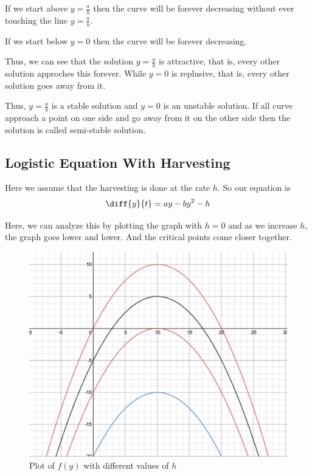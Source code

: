 If we start above $y = \frac{a}{b}$ then the curve will be forever decreasing without ever touching the line $y = \frac{a}{b}$.

If we start below $y = 0$ then the curve will be forever decreasing.

Thus, we can see that the solution $y = \frac{a}{b}$ is attractive, that is, every other solution approches this forever.
While $y = 0$ is replusive, that is, every other solution goes away from it.

Thus, $y = \frac{a}{b}$ is a stable solution and $y = 0$ is an unstable solution.
If all curve approach a point on one side and go away from it on the other side then the solution is called semi-stable solution.
\pagebreak
\subsection{Logistic Equation With Harvesting}

Here we assume that the harvesting is done at the rate $h$.
So our equation is
$$ \diff{y}{t} = ay - by^2 - h $$

Here, we can analyze this by plotting the graph with $h = 0$ and as we increase $h$, the graph goes lower and lower.
And the critical points come closer together.

\begin{figure}[ht!]
	\centering
	\includegraphics[scale=0.3]{./images/lecture_5_figure_4.png}
	\caption{Plot of $f(y)$ with different values of $h$}
\end{figure}

